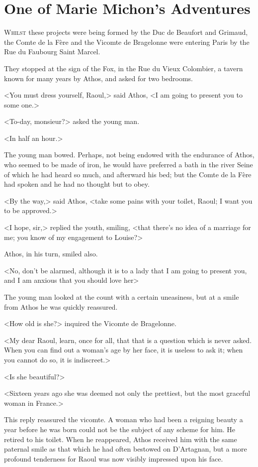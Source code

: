 \chapter{One of Marie Michon's Adventures}

 \lettrine{W}{hilst} these projects were being formed by the Duc de Beaufort and Grimaud, the Comte de la Fère and the Vicomte de Bragelonne were entering Paris by the Rue du Faubourg Saint Marcel.

\zz
They stopped at the sign of the Fox, in the Rue du Vieux Colombier, a tavern known for many years by Athos, and asked for two bedrooms.

<You must dress yourself, Raoul,> said Athos, <I am going to present you to some one.>

<To-day, monsieur?> asked the young man.

<In half an hour.>

The young man bowed. Perhaps, not being endowed with the endurance of Athos, who seemed to be made of iron, he would have preferred a bath in the river Seine of which he had heard so much, and afterward his bed; but the Comte de la Fère had spoken and he had no thought but to obey.

<By the way,> said Athos, <take some pains with your toilet, Raoul; I want you to be approved.>

<I hope, sir,> replied the youth, smiling, <that there's no idea of a marriage for me; you know of my engagement to Louise?>

Athos, in his turn, smiled also.

<No, don't be alarmed, although it is to a lady that I am going to present you, and I am anxious that you should love her\longdash>

The young man looked at the count with a certain uneasiness, but at a smile from Athos he was quickly reassured.

<How old is she?> inquired the Vicomte de Bragelonne.

<My dear Raoul, learn, once for all, that that is a question which is never asked. When you can find out a woman's age by her face, it is useless to ask it; when you cannot do so, it is indiscreet.>

<Is she beautiful?>

<Sixteen years ago she was deemed not only the prettiest, but the most graceful woman in France.>

This reply reassured the vicomte. A woman who had been a reigning beauty a year before he was born could not be the subject of any scheme for him. He retired to his toilet. When he reappeared, Athos received him with the same paternal smile as that which he had often bestowed on D'Artagnan, but a more profound tenderness for Raoul was now visibly impressed upon his face.

